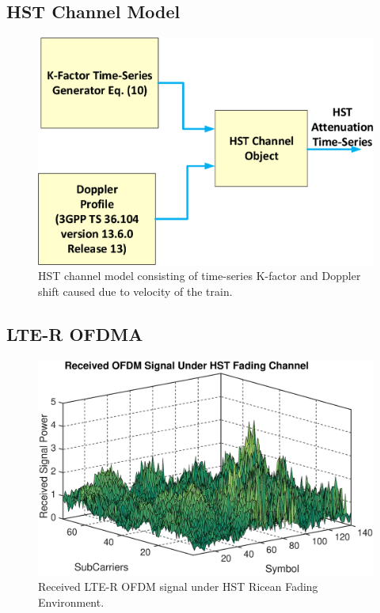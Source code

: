 \subsection{HST Channel Model}

\begin{figure}[!ht]
\label{subblock}
\centering
\includegraphics[width=\linewidth,keepaspectratio]{images/Gill/lte_figs/subblock.eps} 
\caption{HST channel model consisting of time-series K-factor and Doppler shift caused due to velocity of the train.}
\end{figure}



\subsection{LTE-R OFDMA}

\begin{figure}[!ht]
\label{lteofdma}
\centering
\includegraphics[width=\linewidth,keepaspectratio]{images/Gill/lte_figs/receivedsignal.eps} 
\caption{Received LTE-R OFDM signal under HST Ricean Fading Environment. }
\end{figure}





